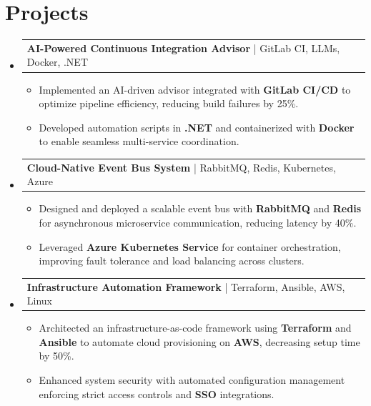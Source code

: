 \documentclass[letterpaper,11pt]{article}
\makeatletter
\newcommand{\resumeItem}[1]{
  \item\footnotesize{
    {#1 \vspace{-2pt}}
  }
}
\newcommand{\resumeProjectHeading}[2]{
    \item
    \begin{tabular*}{1.001\textwidth}{l@{\extracolsep{\fill}}r}
      \small#1 & \textbf{\small #2}\\
    \end{tabular*}\vspace{-7pt}
}
\newcommand{\resumeSubHeadingListStart}{\begin{itemize}[leftmargin=0pt, label={}]}
\newcommand{\resumeSubHeadingListEnd}{\end{itemize}}
\newcommand{\resumeItemListStart}{\begin{itemize}[leftmargin=*]}
\newcommand{\resumeItemListEnd}{\end{itemize}\vspace{-5pt}}
\makeatother
\begin{document}
\section{Projects}
    \vspace{-5pt}
    \resumeSubHeadingListStart
          \resumeProjectHeading
              {\textbf{AI-Powered Continuous Integration Advisor} | GitLab CI, LLMs, Docker, .NET}{}
        \resumeItemListStart
            \resumeItem{Implemented an AI-driven advisor integrated with \textbf{GitLab CI/CD} to optimize pipeline efficiency, reducing build failures by 25\%.}
            \resumeItem{Developed automation scripts in \textbf{.NET} and containerized with \textbf{Docker} to enable seamless multi-service coordination.}
        \resumeItemListEnd
        \vspace{-12pt}
    
    \resumeProjectHeading
        {\textbf{Cloud-Native Event Bus System} | RabbitMQ, Redis, Kubernetes, Azure}{}
        \resumeItemListStart
            \resumeItem{Designed and deployed a scalable event bus with \textbf{RabbitMQ} and \textbf{Redis} for asynchronous microservice communication, reducing latency by 40\%.}
            \resumeItem{Leveraged \textbf{Azure Kubernetes Service} for container orchestration, improving fault tolerance and load balancing across clusters.}
        \resumeItemListEnd
          \vspace{-12pt}
      \resumeProjectHeading
          {\textbf{Infrastructure Automation Framework} | Terraform, Ansible, AWS, Linux}{}
          \resumeItemListStart
              \resumeItem{Architected an infrastructure-as-code framework using \textbf{Terraform} and \textbf{Ansible} to automate cloud provisioning on \textbf{AWS}, decreasing setup time by 50\%.}
              \resumeItem{Enhanced system security with automated configuration management enforcing strict access controls and \textbf{SSO} integrations.}
          \resumeItemListEnd 
    \resumeSubHeadingListEnd
\end{document}
